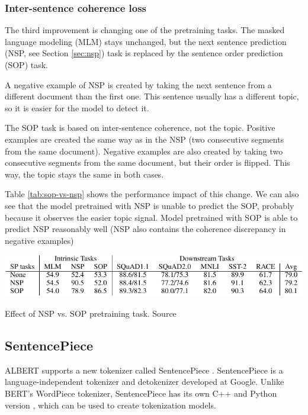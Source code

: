 \documentclass[
  printed, %
  color,   %
  table,   %
  oneside, %
  lof,     %
  lot,     %
]{fithesis3}
\begin{document}
\subsubsection{Inter-sentence coherence loss}
The third improvement is changing one of the pretraining tasks. The masked language modeling (MLM) stays unchanged, but the next sentence prediction (NSP, see Section \ref{sec:nsp}) task is replaced by the sentence order prediction (SOP) task.

A negative example of NSP is created by taking the next sentence from a different document than the first one. This sentence usually has a different topic, so it is easier for the model to detect it.

The SOP task is based on inter-sentence coherence, not the topic. Positive examples are created the same way as in the NSP (two consecutive segments from the same document). Negative examples are also created by taking two consecutive segments from the same document, but their order is flipped. This way, the topic stays the same in both cases.

Table \ref{tab:sop-vs-nsp} shows the performance impact of this change. We can also see that the model pretrained with NSP is unable to predict the SOP, probably because it observes the easier topic signal. Model pretrained with SOP is able to predict NSP reasonably well (NSP also contains the coherence discrepancy in negative examples)

\begin{table}[h]
  \begin{center}
    \includegraphics[width=\linewidth]{img/sop-vs-nsp.pdf}
  \end{center}
  \vspace{-0.5cm}
  \caption[Effect of NSP vs. SOP pretraining task]
    {Effect of NSP vs. SOP pretraining task. Source \parencite[Table 5]{albert}}
  \label{tab:sop-vs-nsp}
\end{table}


\subsection{SentencePiece}
\label{sec:sentencepiece}

ALBERT supports a new tokenizer called SentencePiece \parencite{sentencepiece}. SentencePiece is a language-independent tokenizer and detokenizer developed at Google. Unlike BERT's WordPiece tokenizer, SentencePiece has its own C++ and Python version \parencite{spgit}, which can be used to create tokenization models.
\end{document}
